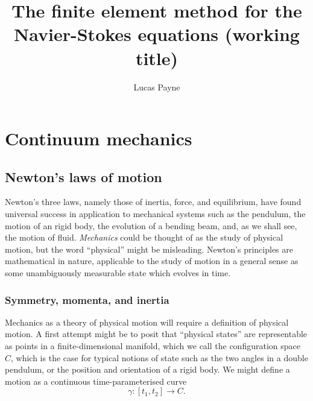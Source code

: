 \documentclass[11pt,a4paper]{memoir}
\title{The finite element method for the Navier-Stokes equations
\scriptsize{(working title)}
}
\author{Lucas Payne}
\begin{document}
\maketitle

\tableofcontents

\chapter{Continuum mechanics}
\section{Newton's laws of motion} %

Newton's three laws, namely those of inertia, force, and equilibrium, have found universal success in application
to mechanical systems such as the pendulum, the motion of an rigid body, the evolution of a bending beam, and, as we shall see,
the motion of fluid. \textit{Mechanics} could be thought of as the study of physical motion, but the word ``physical'' might be misleading.
Newton's principles are mathematical in nature, applicable to the study of motion in a general sense as some unambiguously
measurable state which evolves in time.

\subsection{Symmetry, momenta, and inertia}
Mechanics as a theory of physical motion will require a definition of physical motion. A first attempt might be to posit
that ``physical states'' are representable as points in a finite-dimensional manifold, which we call the configuration space $C$, which is the case for typical
notions of state such as the two angles in a double pendulum, or the position and orientation of a rigid body. We might define a motion as
a continuous time-parameterised curve
    $$\gamma: [t_1, t_2] \rightarrow C.$$
\end{document}
